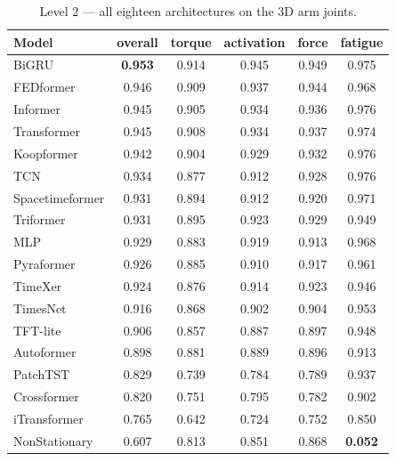 \begin{table}[H]
\centering
\caption{Level 2 --- all eighteen architectures on the 3D arm joints.}
\label{tab:app:l2zoo}
\small
\begin{tabular}{@{}lccccc@{}}
\toprule
\textbf{Model} & \textbf{overall} & \textbf{torque} & \textbf{activation} &
\textbf{force} & \textbf{fatigue} \\
\midrule
BiGRU           & \textbf{0.953} & 0.914 & 0.945 & 0.949 & 0.975 \\
FEDformer       & 0.946 & 0.909 & 0.937 & 0.944 & 0.968 \\
Informer        & 0.945 & 0.905 & 0.934 & 0.936 & 0.976 \\
Transformer     & 0.945 & 0.908 & 0.934 & 0.937 & 0.974 \\
Koopformer      & 0.942 & 0.904 & 0.929 & 0.932 & 0.976 \\
TCN             & 0.934 & 0.877 & 0.912 & 0.928 & 0.976 \\
Spacetimeformer & 0.931 & 0.894 & 0.912 & 0.920 & 0.971 \\
Triformer       & 0.931 & 0.895 & 0.923 & 0.929 & 0.949 \\
MLP             & 0.929 & 0.883 & 0.919 & 0.913 & 0.968 \\
Pyraformer      & 0.926 & 0.885 & 0.910 & 0.917 & 0.961 \\
TimeXer         & 0.924 & 0.876 & 0.914 & 0.923 & 0.946 \\
TimesNet        & 0.916 & 0.868 & 0.902 & 0.904 & 0.953 \\
TFT-lite        & 0.906 & 0.857 & 0.887 & 0.897 & 0.948 \\
Autoformer      & 0.898 & 0.881 & 0.889 & 0.896 & 0.913 \\
PatchTST        & 0.829 & 0.739 & 0.784 & 0.789 & 0.937 \\
Crossformer     & 0.820 & 0.751 & 0.795 & 0.782 & 0.902 \\
iTransformer    & 0.765 & 0.642 & 0.724 & 0.752 & 0.850 \\
NonStationary   & 0.607 & 0.813 & 0.851 & 0.868 & \textbf{0.052} \\
\bottomrule
\end{tabular}
\end{table}

